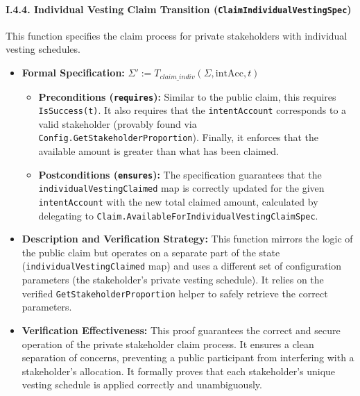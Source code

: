 \documentclass[
  english,
  onecolumn]{article}
\providecommand{\tightlist}{%
  \setlength{\itemsep}{0pt}\setlength{\parskip}{0pt}}
\begin{document}
\paragraph{\texorpdfstring{I.4.4. Individual Vesting Claim Transition
(\texttt{ClaimIndividualVestingSpec})}{I.4.4. Individual Vesting Claim Transition (ClaimIndividualVestingSpec)}}\label{i.4.4.-individual-vesting-claim-transition-claimindividualvestingspec}

This function specifies the claim process for private stakeholders with
individual vesting schedules.

\begin{itemize}
\tightlist
\item
  \textbf{Formal Specification:}
  \(\Sigma' := T_{claim\_indiv}(\Sigma, \text{intAcc}, t)\)

  \begin{itemize}
  \tightlist
  \item
    \textbf{Preconditions (\texttt{requires}):} Similar to the public
    claim, this requires \texttt{IsSuccess(t)}. It also requires that
    the \texttt{intentAccount} corresponds to a valid stakeholder
    (provably found via \texttt{Config.GetStakeholderProportion}).
    Finally, it enforces that the available amount is greater than what
    has been claimed.
  \item
    \textbf{Postconditions (\texttt{ensures}):} The specification
    guarantees that the \texttt{individualVestingClaimed} map is
    correctly updated for the given \texttt{intentAccount} with the new
    total claimed amount, calculated by delegating to
    \texttt{Claim.AvailableForIndividualVestingClaimSpec}.
  \end{itemize}
\item
  \textbf{Description and Verification Strategy:} This function mirrors
  the logic of the public claim but operates on a separate part of the
  state (\texttt{individualVestingClaimed} map) and uses a different set
  of configuration parameters (the stakeholder's private vesting
  schedule). It relies on the verified \texttt{GetStakeholderProportion}
  helper to safely retrieve the correct parameters.
\item
  \textbf{Verification Effectiveness:} This proof guarantees the correct
  and secure operation of the private stakeholder claim process. It
  ensures a clean separation of concerns, preventing a public
  participant from interfering with a stakeholder's allocation. It
  formally proves that each stakeholder's unique vesting schedule is
  applied correctly and unambiguously.
\end{itemize}
\end{document}
